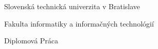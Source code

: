 \begin{center}
\thispagestyle{empty}
{\Large Slovenská technická univerzita v Bratislave}
\par\end{center}{\Large \par}

\begin{center}
{\Large Fakulta informatiky a informačných technológií}
\par\end{center}{\Large \par}

\smallskip{}

\begin{center}
\myEvidenceNumber
\par\end{center}
\vfill{}

\begin{center}
\textbf{\Large \myName}
\par\end{center}{\Large \par}

\medskip{}


\begin{center}
\textbf{\LARGE \myTitleSK }
\par\end{center}{\huge \par}

\medskip{}


\begin{center}

{\Large Diplomová Práca}
\par\end{center}{\Large \par}

\vfill{}